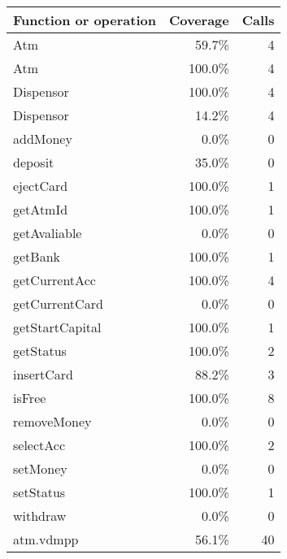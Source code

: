 \documentclass[a4paper]{article}
\begin{document}
\bigskip
\begin{longtable}{|l|r|r|}
\hline
Function or operation & Coverage & Calls \\
\hline
\hline
Atm & 59.7\% & 4 \\
\hline
Atm & 100.0\% & 4 \\
\hline
Dispensor & 100.0\% & 4 \\
\hline
Dispensor & 14.2\% & 4 \\
\hline
addMoney & 0.0\% & 0 \\
\hline
deposit & 35.0\% & 0 \\
\hline
ejectCard & 100.0\% & 1 \\
\hline
getAtmId & 100.0\% & 1 \\
\hline
getAvaliable & 0.0\% & 0 \\
\hline
getBank & 100.0\% & 1 \\
\hline
getCurrentAcc & 100.0\% & 4 \\
\hline
getCurrentCard & 0.0\% & 0 \\
\hline
getStartCapital & 100.0\% & 1 \\
\hline
getStatus & 100.0\% & 2 \\
\hline
insertCard & 88.2\% & 3 \\
\hline
isFree & 100.0\% & 8 \\
\hline
removeMoney & 0.0\% & 0 \\
\hline
selectAcc & 100.0\% & 2 \\
\hline
setMoney & 0.0\% & 0 \\
\hline
setStatus & 100.0\% & 1 \\
\hline
withdraw & 0.0\% & 0 \\
\hline
\hline
atm.vdmpp & 56.1\% & 40 \\
\hline
\end{longtable}
\end{document}
